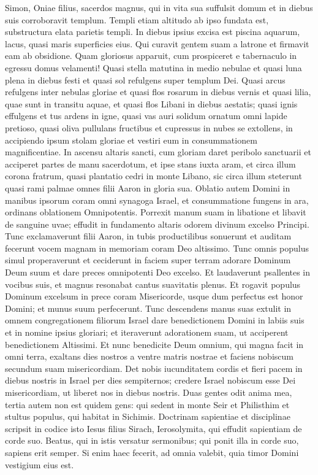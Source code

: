 \begin{biblechapter}  
\verse Simon, Oniae filius, sacerdos magnus, qui in vita sua suffulsit domum et in diebus suis corroboravit templum. 
\verse Templi etiam altitudo ab ipso fundata est, substructura elata parietis templi. 
\verse In diebus ipsius excisa est piscina aquarum, lacus, quasi maris superficies eius. 
\verse Qui curavit gentem suam a latrone et firmavit eam ab obsidione. 
\verse Quam gloriosus apparuit, cum prospiceret e tabernaculo in egressu domus velamenti! 
\verse Quasi stella matutina in medio nebulae et quasi luna plena in diebus festi 
\verse et quasi sol refulgens super templum Dei. 
\verse Quasi arcus refulgens inter nebulas gloriae et quasi flos rosarum in diebus vernis et quasi lilia, quae sunt in transitu aquae, et quasi flos Libani in diebus aestatis; 
\verse quasi ignis effulgens et tus ardens in igne, 
\verse quasi vas auri solidum ornatum omni lapide pretioso, 
\verse quasi oliva pullulans fructibus et cupressus in nubes se extollens, in accipiendo ipsum stolam gloriae et vestiri eum in consummationem magnificentiae. 
\verse In ascensu altaris sancti, cum gloriam daret peribolo sanctuarii 
\verse et acciperet partes de manu sacerdotum, et ipse stans iuxta aram, et circa illum corona fratrum, quasi plantatio cedri in monte Libano, 
\verse sic circa illum steterunt quasi rami palmae omnes filii Aaron in gloria sua. 
\verse Oblatio autem Domini in manibus ipsorum coram omni synagoga Israel, et consummatione fungens in ara, ordinans oblationem Omnipotentis. 
\verse Porrexit manum suam in libatione et libavit de sanguine uvae; 
\verse effudit in fundamento altaris odorem divinum excelso Principi. 
\verse Tunc exclamaverunt filii Aaron, in tubis productilibus sonuerunt et auditam fecerunt vocem magnam in memoriam coram Deo altissimo. 
\verse Tunc omnis populus simul properaverunt et ceciderunt in faciem super terram adorare Dominum Deum suum et dare preces omnipotenti Deo excelso. 
\verse Et laudaverunt psallentes in vocibus suis, et magnus resonabat cantus suavitatis plenus. 
\verse Et rogavit populus Dominum excelsum in prece coram Misericorde, usque dum perfectus est honor Domini; et munus suum perfecerunt. 
\verse Tunc descendens manus suas extulit in omnem congregationem filiorum Israel dare benedictionem Domini in labiis suis et in nomine ipsius gloriari; 
\verse et iteraverunt adorationem suam, ut acciperent benedictionem Altissimi. 
\verse Et nunc benedicite Deum omnium, qui magna facit in omni terra, exaltans dies nostros a ventre matris nostrae et faciens nobiscum secundum suam misericordiam. 
\verse Det nobis iucunditatem cordis et fieri pacem in diebus nostris in Israel per dies sempiternos; 
\verse credere Israel nobiscum esse Dei misericordiam, ut liberet nos in diebus nostris. 
\verse Duas gentes odit anima mea, tertia autem non est quidem gens: 
\verse qui sedent in monte Seir et Philisthim et stultus populus, qui habitat in Sichimis. 
\verse Doctrinam sapientiae et disciplinae scripsit in codice isto Iesus filius Sirach, Ierosolymita, qui effudit sapientiam de corde suo. 
\verse Beatus, qui in istis versatur sermonibus; qui ponit illa in corde suo, sapiens erit semper. 
\verse Si enim haec fecerit, ad omnia valebit, quia timor Domini vestigium eius est. 
\end{biblechapter}

